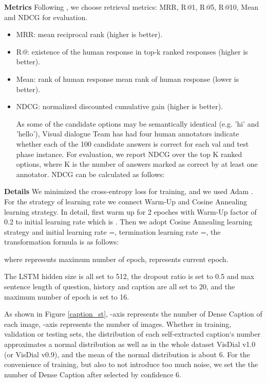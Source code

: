 \documentclass[letterpaper]{article} \usepackage{aaai20}  \usepackage{times}  \usepackage{helvet} \usepackage{courier}  \usepackage[hyphens]{url}  \usepackage{graphicx} \urlstyle{rm} \def\UrlFont{\rm}  \usepackage{graphicx}  \frenchspacing  \setlength{\pdfpagewidth}{8.5in}  \setlength{\pdfpageheight}{11in}  \usepackage{mathrsfs} \usepackage{amsfonts,amssymb}  \usepackage{tabularx} \usepackage{url}
\begin{document}
\textbf{Metrics}
Following \cite{Das2017Visual}, we choose retrieval metrics: MRR, R\textsl{@}1, R\textsl{@}5, R\textsl{@}10, Mean and NDCG for evaluation. 
\begin{itemize}
\item MRR: 
mean reciprocal rank (higher is better).
\item R\textsl{@}:
existence of the human response in top-k ranked responses (higher is better).
\item Mean: rank of human response
mean rank of human response (lower is better).
\item NDCG: 
normalized discounted cumulative gain (higher is better). 

As some of the candidate options may be semantically identical (e.g. 'hi' and 'hello'), Visual dialogue Team has had four human annotators indicate whether each of the 100 candidate answers is correct for each val and test phase instance. For evaluation, we report NDCG over the top K ranked options, where K is the number of answers marked as correct by at least one annotator. NDCG can be calculated as follows:


\end{itemize}


\textbf{Details}
We minimized the cross-entropy loss for training, and we used Adam \cite{Kingma2014Adam}. For the strategy of learning rate we connect Warm-Up and Cosine Annealing learning strategy. In detail, first warm up for 2 epoches with Warm-Up factor of 0.2 to initial learning rate which is . Then we adopt Cosine Annealing learning strategy and initial learning rate =, termination learning rate =, the transformation formula is as follows:

where  represents maximum number of epoch,  represents current epoch.

The LSTM hidden size is all set to 512, the dropout ratio is set to 0.5 and max sentence length of question, history and caption are all set to 20, and the maximum number of epoch is set to 16.



As shown in Figure \ref{caption_st}, -axis represents the number of Dense Caption of each image, -axis represents the number of images. Whether in training, validation or testing sets, the distribution of each self-extracted caption`s number approximates a normal distribution as well as in the whole dataset VisDial v1.0 (or VisDial v0.9), and the mean of the normal distribution is about 6. For the convenience of training, but also to not introduce too much noise, we set the the number of Dense Caption after selected by confidence  6.
\fi
\end{document}
